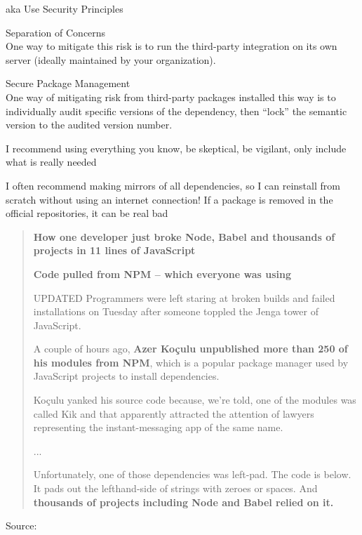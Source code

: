 \documentclass[Screen16to9,17pt]{foils}
\begin{document}

{\Large aka Use Security Principles}

\begin{list2}
\item Separation of Concerns\\
One way to mitigate this risk is to run the third-party integration on its
own server (ideally maintained by your organization).
\item Secure Package Management\\
One way of mitigating risk from
third-party packages installed this way is to individually audit specific versions of the
dependency, then “lock” the semantic version to the audited version number.
\end{list2}

I recommend using everything you know, be skeptical, be vigilant, only include what is really needed

I often recommend making mirrors of all dependencies, so I can reinstall from scratch without using an internet connection! If a package is removed in the official repositories, it can be real bad

\slide{}


\begin{quote}
{\Large \bf How one developer just broke Node, Babel and thousands of projects in 11 lines of JavaScript}

{\bf Code pulled from NPM – which everyone was using}

UPDATED Programmers were left staring at broken builds and failed installations on Tuesday after someone toppled the Jenga tower of JavaScript.

A couple of hours ago, {\bf Azer Koçulu unpublished more than 250 of his modules from NPM}, which is a popular package manager used by JavaScript projects to install dependencies.

Koçulu yanked his source code because, we're told, one of the modules was called Kik and that apparently attracted the attention of lawyers representing the instant-messaging app of the same name.

...

Unfortunately, one of those dependencies was left-pad. The code is below. It pads out the lefthand-side of strings with zeroes or spaces. And {\bf thousands of projects including Node and Babel relied on it.}
\end{quote}
Source: 
\end{document}

